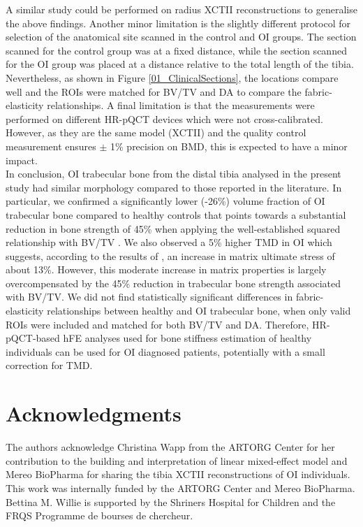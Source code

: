 \documentclass[a4paper,fleqn]{DC_ArtStyle}
\newcommand{\Add}[1]{{\color{blue}{#1}}}
\begin{document}
	A similar study could be performed on radius XCTII reconstructions to generalise the above findings. Another minor limitation is the slightly different protocol for selection of the anatomical site scanned in the control and OI groups. The section scanned for the control group was at a fixed distance, while the section scanned for the OI group was placed at a distance relative to the total length of the tibia. Nevertheless, as shown in Figure \ref{01_ClinicalSections}, the locations compare well and the ROIs were matched for BV/TV and DA to compare the fabric-elas\-ticity relationships. A final limitation is that the measurements were performed on different HR-pQCT devices which were not cross-calibrated. However, as they are the same model (XCTII) and the quality control measurement ensures $\pm$ 1\% precision on BMD, this is expected to have a minor impact. \\
	
	In conclusion, OI trabecular bone from the distal tibia analysed in the present study had similar morphology compared to those reported in the literature. In particular, we confirmed a significantly lower (-26\%) volume fraction of OI trabecular bone compared to healthy controls that points towards a substantial reduction in bone strength of 45\% when applying the well-established squared relationship with BV/\-TV \cite{Fleps2020}. 
	We also observed a 5\% higher TMD in OI %
	which suggests, according to the results of \citeauthor{Indermaur2021}\cite{Indermaur2021}, an increase in matrix ultimate stress of about 13\%. %
	However, this moderate increase in matrix properties is large\-ly overcompensated by the 45\% reduction in trabecular bone strength associated with BV/TV. %
	We did not find statistically significant differences in fabric-elasticity relationships between healthy and OI trabecular bone, when only valid ROIs were included and matched for both BV/TV and DA. Therefore, \Add{with the gained knowledge of this study,} HR-pQCT-based hFE analyses used for bone stiffness estimation of healthy individuals can be used for OI diagnosed patients, potentially with a small correction for TMD.

	
	\section*{Acknowledgments}
	The authors acknowledge Christina Wapp from the ARTORG Center for her contribution to the building and interpretation of linear mixed-effect model and Mereo BioPharma for sharing the tibia XCTII reconstructions of OI individuals. This work was internally funded by the ARTORG Center and Mereo BioPharma.  Bettina M. Willie is supported by the Shriners Hospital for Children and the FRQS Programme de bourses de chercheur. 
	
\end{document}
